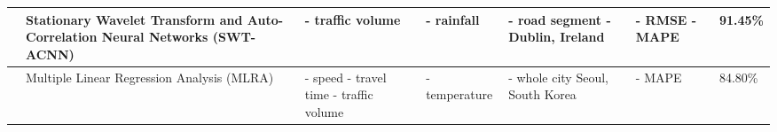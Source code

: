 \begin{sidewaystable}
\begin{tabular}{| L{3cm} | L{3cm} | L{3cm} | L{3cm} | L{3cm} | L{3cm} | L{2cm} |}
    \hline
     &
    Stationary Wavelet Transform and Auto-Correlation Neural Networks (SWT-ACNN) &
    - traffic volume &
    - rainfall &
    - road segment
    \newline
    - Dublin, Ireland & 
    - RMSE
    \newline
    - MAPE
    &
    91.45\% \\
    
    \hline
     &
    Multiple Linear Regression Analysis (MLRA) &
    - speed 
    \newline
    - travel time
    \newline
    - traffic volume &
    - temperature &
    - whole city 
    \newline
    Seoul, South Korea &
    - MAPE &
    84.80\% \\
    
    \hline
    
    \end{tabular}
\end{sidewaystable}
